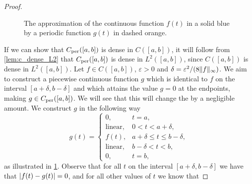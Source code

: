 \documentclass[../thesis.tex]{subfiles}
\begin{document}
\begin{proof}
    \begin{figure}
        \centering
        
        \caption{The approximation of the continuous function $f(t)$ in a solid blue by a periodic function $g(t)$ in dashed orange.}
        \label{fig:g_periodic_close_to_f}
    \end{figure}
    If we can show that $C_{\text{per}}([a,b])$ is dense in $C([a,b])$, it will follow from \cref{lem:c_dense_L2} that $C_{\text{per}}([a,b])$ is dense in $L^2([a,b])$, since $C([a,b])$ is dense in $L^2([a,b])$. Let $f \in C([a,b])$, $\varepsilon>0$ and $\delta = \varepsilon^2/(8\|f\|_\infty)$. We aim to construct a piecewise continuous function $g$ which is identical to $f$ on the interval $[a+\delta,b-\delta ]$ and which attains the value $g = 0$ at the endpoints, making $g\in C_{\text{per}}([a,b])$. We will see that this will change the \Ltwonorm \space by a negligible amount. %
    We construct $g$ in the following way  %
    \begin{equation*} %
        g(t) = 
        \begin{cases} 0, &  t=a,\\  
            \text{linear}, &  0<t<a+\delta,\\ 
            f(t), & a+\delta \leq t \leq b-\delta,\\ 
            \text{linear}, &  b-\delta <t<b,\\ 
            0, &  t=b,
        \end{cases}
    \end{equation*} 
    as illustrated in \cref{fig:g_periodic_close_to_f}. Observe that for all $t$ on the interval $[a+\delta, b-\delta]$ we have that $|f(t)-g(t)|= 0$, and for all other values of $t$ we know that

\end{proof}
\end{document}
